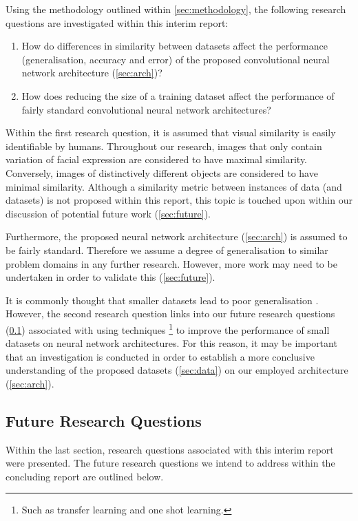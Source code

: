 \documentclass{article}
\begin{document}
Using the methodology outlined within \ref{sec:methodology}, the following research questions are investigated within this interim report:

\begin{enumerate}
  \item How do differences in similarity between datasets affect the performance (generalisation, accuracy and error) of the proposed convolutional neural network architecture (\ref{sec:arch})?
  \item How does reducing the size of a training dataset affect the performance of fairly standard convolutional neural network architectures?
\end{enumerate}

Within the first research question, it is assumed that visual similarity is easily identifiable by humans. Throughout our research, images that only contain variation of facial expression are considered to have maximal similarity. Conversely, images of distinctively different objects are considered to have minimal similarity. Although a similarity metric between instances of data (and datasets) is not proposed within this report, this topic is touched upon within our discussion of potential future work (\ref{sec:future}).

Furthermore, the proposed neural network architecture (\ref{sec:arch}) is assumed to be fairly standard. Therefore we assume a degree of generalisation to similar problem domains in any further research. However, more work may need to be undertaken in order to validate this (\ref{sec:future}).

It is commonly thought that smaller datasets lead to poor generalisation \cite{lotsDataAndrew} \cite{krizhevsky2012imagenet}. However, the second research question links into our future research questions (\ref{sec:frquestions}) associated with using techniques \footnote{Such as transfer learning and one shot learning.} to improve the performance of small datasets on neural network architectures. For this reason, it may be important that an investigation is conducted in order to establish a more conclusive understanding of the proposed datasets (\ref{sec:data}) on our employed architecture (\ref{sec:arch}).

\subsection{Future Research Questions}
\label{sec:frquestions}

Within the last section, research questions associated with this interim report were presented. The future research questions we intend to address within the concluding report are outlined below.
\end{document}
